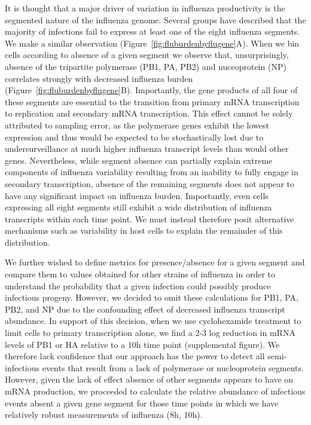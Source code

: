 \documentclass[9pt,lineno]{elife}
\begin{document}
It is thought that a major driver of variation in influenza productivity is the segmented nature of the influenza genome.
Several groups have described that the majority of infections fail to express at least one of the eight influenza segments. 
We make a similar observation (Figure~\ref{fig:fluburdenbyflugene}A). 
When we bin cells according to absence of a given segment we observe that, unsurprisingly, absence of the tripartite polymerase (PB1, PA, PB2) and nuceoprotein (NP) correlates strongly with decreased influenza burden (Figure~\ref{fig:fluburdenbyflugene}B). 
Importantly, the gene products of all four of these segments are essential to the transition from primary mRNA transcription to replication and secondary mRNA transcription. 
This effect cannot be solely attributed to sampling error, as the polymerase genes exhibit the lowest expression and thus would be expected to be stochastically lost due to undersurveillance at much higher influenza transcript levels than would other genes. 
Nevertheless, while segment absence can partially explain extreme components of influenza variability resulting from an inability to fully engage in secondary transcription, absence of the remaining segments does not appear to have any significant impact on influenza burden.
Importantly, even cells expressing all eight segments still exhibit a wide distribution of influenza transcripts within each time point. We must instead therefore posit alternative mechanisms such as variability in host cells to explain the remainder of this distribution.  

We further wished to define metrics for presence/absence for a given segment and compare them to values obtained for other strains of influenza in order to understand the probability that a given infection could possibly produce infectious progeny. 
However, we decided to omit these calculations for PB1, PA, PB2, and NP due to the confounding effect of decreased influenza transcript abundance. 
In support of this decision, when we use cyclohexamide treatment to limit cells to primary transcription alone, we find a 2-3 log reduction in mRNA levels of PB1 or HA relative to a 10h time point (supplemental figure). 
We therefore lack confidence that our approach has the power to detect all semi-infectious events that result from a lack of polymerase or nucleoprotein segments.
However, given the lack of effect absence of other segments appears to have on mRNA production, we proceeded to calculate the relative abundance of infectious events absent a given gene segment for those time points in which we have relatively robust measurements of influenza (8h, 10h).
\end{document}
